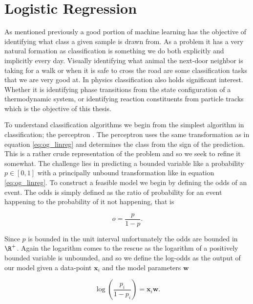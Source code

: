 
\section{Logistic Regression}\label{sec:LogReg}

As mentioned previously a good portion of machine learning has the objective of identifying what class a given sample is drawn from. As a problem it has a very natural formation as classification is something we do both explicitly and implicitly every day. Visually identifying what animal the next-door neighbor is taking for a walk or when it is safe to cross the road are some classification tasks that we are very good at. In physics classification also holds significant interest. Whether it is identifying phase transitions from the state configuration of a thermodynamic system, or identifying reaction constituents from particle tracks which is the objective of this thesis.

To understand classification algorithms we begin from the simplest algorithm in classification; the perceptron \cite{Rosenblatt1958}. The perceptron uses the same transformation as in equation \ref{eq:og_linreg} and determines the class from the sign of the prediction. This is a rather crude representation of the problem and so we seek to refine it somewhat. The challenge lies in predicting a bounded variable like a probability $p \in [0,1]$ with a principally unbound transformation like in equation \ref{eq:og_linreg}. To construct a feasible model we begin by defining the odds of an event. The odds is simply defined as the ratio of probability for an event happening to the probability of it not happening, that is 

\begin{equation}\label{eq:odds}
o = \frac{p}{1-p}.
\end{equation}

\noindent Since $p$ is bounded in the unit interval unfortunately the odds are bounded in $\R^+$. Again the logarithm comes to the rescue as the logarithm of a positively bounded variable is unbounded, and so we define the log-odds as the output of our model given a data-point $\boldsymbol{x}_i$ and the model parameters $\boldsymbol{w}$

\begin{equation}\label{eq:log_odds}
\log \left(\frac{p_i}{1-p_i}\right) = \boldsymbol{x}_i\boldsymbol{w}. 
\end{equation} 

